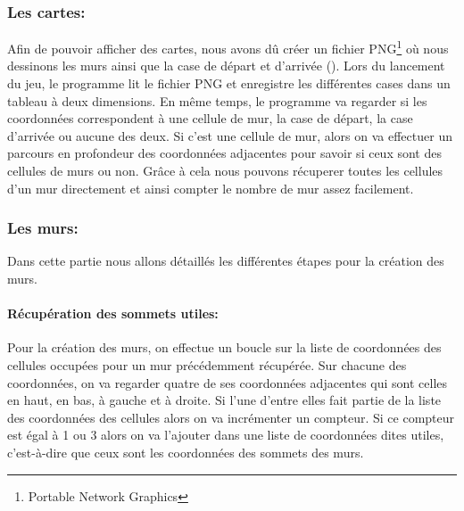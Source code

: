 \documentclass[11pt]{article}
\begin{document}
\subsubsection{Les cartes:}
Afin de pouvoir afficher des cartes, nous avons dû créer un fichier PNG\footnote{Portable Network Graphics} où nous dessinons les murs ainsi que la case de départ et d'arrivée (). Lors du lancement du jeu, le programme lit le fichier PNG et enregistre les différentes cases dans un tableau à deux dimensions. En même temps, le programme va regarder si les coordonnées correspondent à une cellule de mur, la case de départ, la case d'arrivée ou aucune des deux. Si c'est une cellule de mur, alors on va effectuer un parcours en profondeur des coordonnées adjacentes pour savoir si ceux sont des cellules de murs ou non. Grâce à cela nous pouvons récuperer toutes les cellules d'un mur directement et ainsi compter le nombre de mur assez facilement.
\subsubsection{Les murs:}

Dans cette partie nous allons détaillés les différentes étapes pour la création des murs.

\paragraph{Récupération des sommets utiles:}

Pour la création des murs, on effectue un boucle sur la liste de coordonnées des cellules occupées pour un mur précédemment récupérée. Sur chacune des coordonnées, on va regarder quatre de ses coordonnées adjacentes qui sont celles en haut, en bas, à gauche et à droite. Si l'une d'entre elles fait partie de la liste des coordonnées des cellules alors on va incrémenter un compteur. Si ce compteur est égal à 1 ou 3 alors on va l'ajouter dans une liste de coordonnées dites utiles, c'est-à-dire que ceux sont les coordonnées des sommets des murs.
\end{document}
